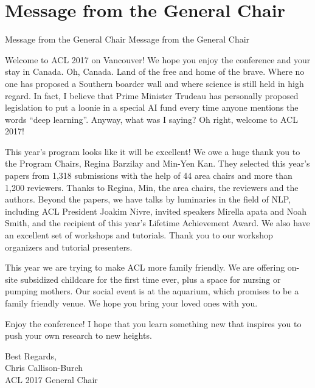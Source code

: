 \section{Message from the General Chair}\vspace{2em}
\setheaders%
    {Message from the General Chair}%
    {Message from the General Chair}
\thispagestyle{emptyheader}

\setlength{\parskip}{1ex}

Welcome to ACL 2017 on Vancouver!  We hope you enjoy the conference and your
stay in Canada. Oh, Canada. Land of the free and home of the brave. Where no
one has proposed a Southern boarder wall and where science is still held in
high regard.  In fact, I believe that Prime Minister Trudeau has personally
proposed legislation to put a loonie in a special AI fund every time anyone
mentions the words ``deep learning''.  Anyway, what was I saying? Oh right,
welcome to ACL 2017!  

This year's program looks like it will be excellent!  We owe a huge thank you
to the Program Chairs, Regina Barzilay and Min-Yen Kan.  They selected this
year's papers from 1,318 submissions with the help of 44 area chairs and more
than 1,200 reviewers. Thanks to Regina, Min, the area chairs, the reviewers
and the authors. Beyond the papers, we have talks by luminaries in the field
of NLP, including ACL President Joakim Nivre, invited speakers Mirella 
apata and Noah Smith, and the recipient of this year's Lifetime Achievement
Award.  We also have an excellent set of workshops and tutorials. Thank you to
our workshop organizers and tutorial presenters. 

This year we are trying to make ACL more family friendly. We are offering
on-site subsidized childcare for the first time ever, plus a space for nursing
or pumping mothers. Our social event is at the aquarium, which promises to be
a family friendly venue. We hope you bring your loved ones with you.  

Enjoy the conference! I hope that you learn something new that inspires you to
push your own research to new heights.  

\vskip 0.5in
\noindent Best Regards,\\
Chris Callison-Burch\\
ACL 2017 General Chair



